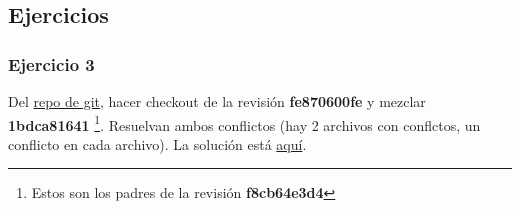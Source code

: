 \subsection{Ejercicios}
\subsubsection{Ejercicio 3}
Del \hyperref[git_repo]{repo de git}, hacer checkout de la revisión {\bf fe870600fe} y mezclar {\bf 1bdca81641}
\footnote{Estos son los padres de la revisión {\bf f8cb64e3d4}}. Resuelvan ambos conflictos (hay 2 archivos con conflctos,
un conflicto en cada archivo). La solución está \hyperref[example_03]{aquí}.

